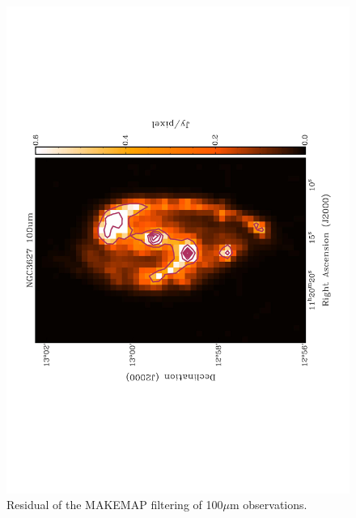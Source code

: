 \begin{figure}
  \centering
  \label{fig_100}
  \includegraphics[scale=0.5,angle=270]{obs_imgs/100_um.jpeg}
  \caption[NGC3627 100$\mu$m Observations]{Residual of the MAKEMAP filtering of 100$\mu$m observations.}
\end{figure}

